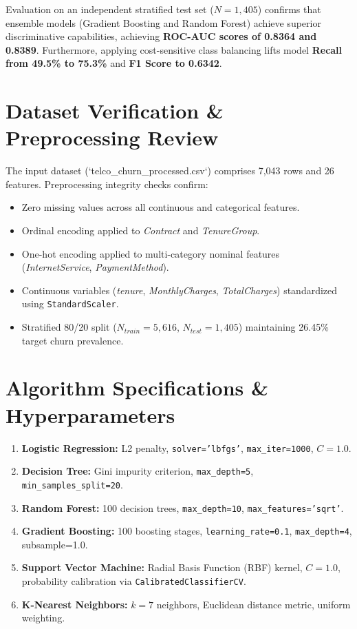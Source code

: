 \documentclass[11pt,a4paper]{article}
\begin{document}
Evaluation on an independent stratified test set ($N=1,405$) confirms that ensemble models (Gradient Boosting and Random Forest) achieve superior discriminative capabilities, achieving \textbf{ROC-AUC scores of 0.8364 and 0.8389}. Furthermore, applying cost-sensitive class balancing lifts model \textbf{Recall from 49.5\% to 75.3\%} and \textbf{F1 Score to 0.6342}.

\section{Dataset Verification & Preprocessing Review}
The input dataset (`telco_churn_processed.csv`) comprises 7,043 rows and 26 features. Preprocessing integrity checks confirm:
\begin{itemize}
    \item Zero missing values across all continuous and categorical features.
    \item Ordinal encoding applied to \textit{Contract} and \textit{TenureGroup}.
    \item One-hot encoding applied to multi-category nominal features (\textit{InternetService}, \textit{PaymentMethod}).
    \item Continuous variables (\textit{tenure}, \textit{MonthlyCharges}, \textit{TotalCharges}) standardized using \texttt{StandardScaler}.
    \item Stratified 80/20 split ($N_{train}=5,616$, $N_{test}=1,405$) maintaining 26.45\% target churn prevalence.
\end{itemize}

\section{Algorithm Specifications & Hyperparameters}
\begin{enumerate}
    \item \textbf{Logistic Regression:} L2 penalty, \texttt{solver='lbfgs'}, \texttt{max\_iter=1000}, $C=1.0$.
    \item \textbf{Decision Tree:} Gini impurity criterion, \texttt{max\_depth=5}, \texttt{min\_samples\_split=20}.
    \item \textbf{Random Forest:} 100 decision trees, \texttt{max\_depth=10}, \texttt{max\_features='sqrt'}.
    \item \textbf{Gradient Boosting:} 100 boosting stages, \texttt{learning\_rate=0.1}, \texttt{max\_depth=4}, subsample=1.0.
    \item \textbf{Support Vector Machine:} Radial Basis Function (RBF) kernel, $C=1.0$, probability calibration via \texttt{CalibratedClassifierCV}.
    \item \textbf{K-Nearest Neighbors:} $k=7$ neighbors, Euclidean distance metric, uniform weighting.
\end{enumerate}
\end{document}
